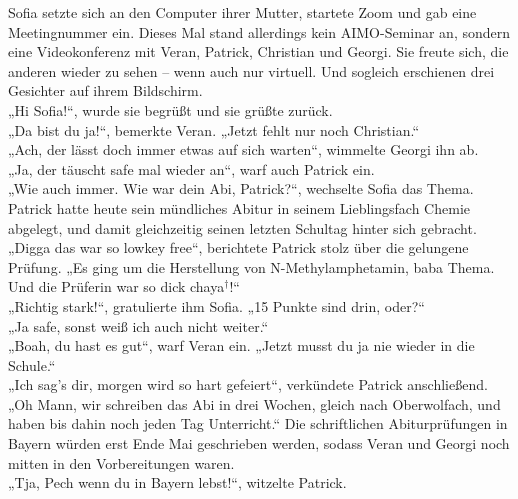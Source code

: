 \documentclass[oneside]{memoir}
\begin{document}
\medskip
\noindent Sofia setzte sich an den Computer ihrer Mutter, startete Zoom und gab eine Meetingnummer ein. Dieses Mal stand allerdings kein AIMO-Seminar an, sondern eine Videokonferenz mit Veran, Patrick, Christian und Georgi. Sie freute sich, die anderen wieder zu sehen – wenn auch nur virtuell. Und sogleich erschienen drei Gesichter auf ihrem Bildschirm. \\
„Hi Sofia!“, wurde sie begrüßt und sie grüßte zurück. \\
„Da bist du ja!“, bemerkte Veran. „Jetzt fehlt nur noch Christian.“ \\
„Ach, der lässt doch immer etwas auf sich warten“, wimmelte Georgi ihn ab. \\
„Ja, der täuscht safe mal wieder an“, warf auch Patrick ein. \\
„Wie auch immer. Wie war dein Abi, Patrick?“, wechselte Sofia das Thema. Patrick hatte heute sein mündliches Abitur in seinem Lieblingsfach Chemie abgelegt, und damit gleichzeitig seinen letzten Schultag hinter sich gebracht. \\
„Digga das war so lowkey free“, berichtete Patrick stolz über die gelungene Prüfung. „Es ging um die Herstellung von N-Methylamphetamin, baba Thema. Und die Prüferin war so dick chaya$^{\dagger}$!“ \\
„Richtig stark!“, gratulierte ihm Sofia. „15 Punkte sind drin, oder?“ \\
„Ja safe, sonst weiß ich auch nicht weiter.“ \\
„Boah, du hast es gut“, warf Veran ein. „Jetzt musst du ja nie wieder in die Schule.“ \\
„Ich sag's dir, morgen wird so hart gefeiert“, verkündete Patrick anschließend. \\
„Oh Mann, wir schreiben das Abi in drei Wochen, gleich nach Oberwolfach, und haben bis dahin noch jeden Tag Unterricht.“ Die schriftlichen Abiturprüfungen in Bayern würden erst Ende Mai geschrieben werden, sodass Veran und Georgi noch mitten in den Vorbereitungen waren. \\
„Tja, Pech wenn du in Bayern lebst!“, witzelte Patrick.
\end{document}

